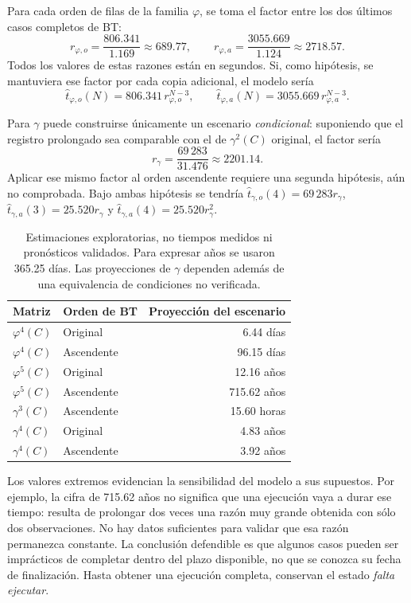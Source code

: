 Para cada orden de filas de la familia $\varphi$, se toma el factor
entre los dos últimos casos completos de BT:
\[
r_{\varphi,o}=\frac{806.341}{1.169}\approx689.77,
\qquad
r_{\varphi,a}=\frac{3055.669}{1.124}\approx2718.57.
\]
Todos los valores de estas razones están en segundos. Si, como
hipótesis, se mantuviera ese factor por cada copia adicional,
el modelo sería
\[
\widehat t_{\varphi,o}(N)=806.341\,r_{\varphi,o}^{N-3},
\qquad
\widehat t_{\varphi,a}(N)=3055.669\,r_{\varphi,a}^{N-3}.
\]

Para $\gamma$ puede construirse únicamente un escenario
\emph{condicional}: suponiendo que el registro prolongado sea
comparable con el de $\gamma^2(C)$ original, el factor sería
\[
r_\gamma=\frac{69\,283}{31.476}\approx2201.14.
\]
Aplicar ese mismo factor al orden ascendente requiere una segunda
hipótesis, aún no comprobada. Bajo ambas hipótesis se tendría
$\widehat t_{\gamma,o}(4)=69\,283r_\gamma$,
$\widehat t_{\gamma,a}(3)=25.520r_\gamma$ y
$\widehat t_{\gamma,a}(4)=25.520r_\gamma^2$.

\begin{table}[htbp]
\centering
\small
\begin{tabular}{l l r}
\toprule
Matriz & Orden de BT & Proyección del escenario\\
\midrule
$\varphi^4(C)$ & Original   & 6.44 días\\
$\varphi^4(C)$ & Ascendente & 96.15 días\\
$\varphi^5(C)$ & Original   & 12.16 años\\
$\varphi^5(C)$ & Ascendente & 715.62 años\\
$\gamma^3(C)$  & Ascendente & 15.60 horas\\
$\gamma^4(C)$  & Original   & 4.83 años\\
$\gamma^4(C)$  & Ascendente & 3.92 años\\
\bottomrule
\end{tabular}
\caption{Estimaciones exploratorias, no tiempos medidos ni pronósticos
validados. Para expresar años se usaron 365.25 días. Las proyecciones
de $\gamma$ dependen además de una equivalencia de condiciones no verificada.}
\label{tab:escenario53}
\end{table}

Los valores extremos evidencian la sensibilidad del modelo a sus
supuestos. Por ejemplo, la cifra de 715.62 años no significa que
una ejecución vaya a durar ese tiempo: resulta de prolongar dos
veces una razón muy grande obtenida con sólo dos observaciones.
No hay datos suficientes para validar que esa razón permanezca
constante. La conclusión defendible es que algunos casos pueden
ser imprácticos de completar dentro del plazo disponible, no que
se conozca su fecha de finalización. Hasta obtener una ejecución
completa, conservan el estado \emph{falta ejecutar}.

